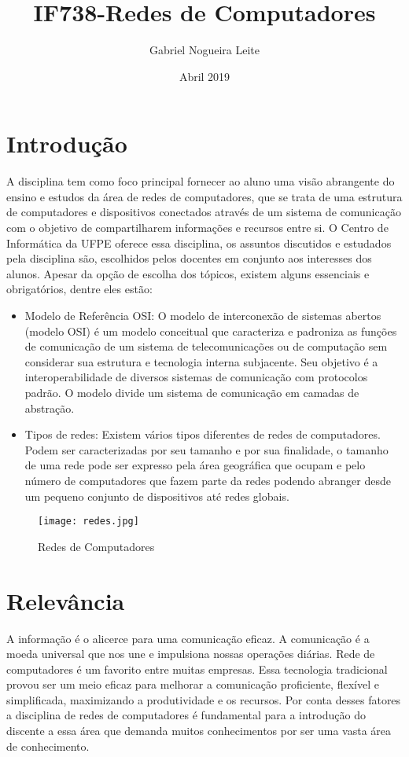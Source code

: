 \documentclass{article}
\title{IF738-Redes de Computadores}
\author{Gabriel Nogueira Leite }
\date{\vspace{-5ex}}
\date{Abril 2019}
\begin{document}
\maketitle

\section{Introdução}
A disciplina tem como foco principal fornecer ao aluno uma visão abrangente do ensino e estudos da área de  redes de computadores, que se trata de uma estrutura de computadores e dispositivos conectados através de um sistema de comunicação com o objetivo de compartilharem informações e recursos entre si. O Centro de Informática da UFPE oferece essa disciplina, os assuntos discutidos e estudados pela disciplina são, escolhidos pelos docentes em conjunto aos interesses dos alunos.
\cite {referenciaDisciplina1, referenciaDisciplina2}
Apesar da opção de escolha dos tópicos, existem alguns essenciais e obrigatórios, dentre eles estão:

\begin{itemize}
   \item Modelo de Referência OSI: O modelo de interconexão de sistemas abertos (modelo OSI) é um modelo conceitual que caracteriza e padroniza as funções de comunicação de um sistema de telecomunicações ou de computação sem considerar sua estrutura e tecnologia interna subjacente.
   \cite{referenciaDisciplina3}
   Seu objetivo é a interoperabilidade de diversos sistemas de comunicação com protocolos padrão. O modelo divide um sistema de comunicação em camadas de abstração.
    \cite {networkWorld}
   \item Tipos de redes: Existem vários tipos diferentes de redes de computadores. Podem ser caracterizadas por seu tamanho e por sua finalidade, o tamanho de uma rede pode ser expresso pela área geográfica que ocupam e pelo número de computadores que fazem parte da redes podendo abranger desde um pequeno conjunto de dispositivos até redes globais.
   \cite{networks}
 \end{itemize}

\begin{figure}[ht]
\centering
\texttt{[image: redes.jpg]}
\caption{Redes de Computadores}
\cite{imagem}
\label{fig: redes.jpg}
\end{figure}

\section{Relevância}
A informação é o alicerce para uma comunicação eficaz. A comunicação é a moeda universal que nos une e impulsiona nossas operações diárias. Rede de computadores é um favorito entre muitas empresas. Essa tecnologia tradicional provou ser um meio eficaz para melhorar a comunicação proficiente, flexível e simplificada, maximizando a produtividade e os recursos.
\cite{networkImportance}
Por conta desses fatores a disciplina de redes de computadores é fundamental para a introdução do discente a essa área que demanda muitos conhecimentos por ser uma vasta área de conhecimento.
\end{document}
